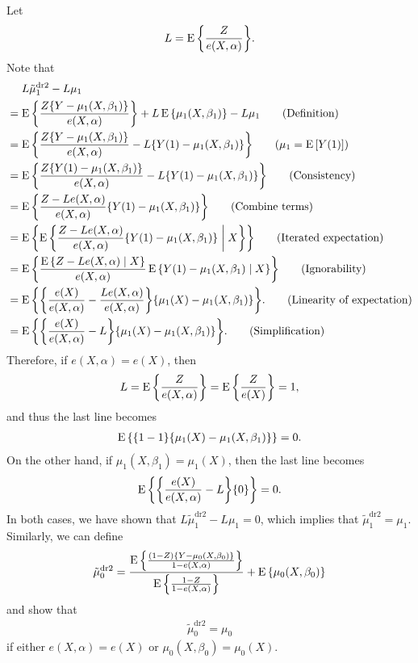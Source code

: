 \documentclass[10pt]{article}
\begin{document}
Let 
\begin{align*}
  L = \operatorname{E}{\left\lbrace \frac{Z}{e(X, \alpha)} \right\rbrace}.
\end{align*}
Note that
\begin{align*}
  &\mathrel{\phantom{=}} L\tilde{\mu}_1^{\text{dr2}} - L\mu_1 \\
  &= \E\bc{\frac{Z\bc{Y - \mu_1(X, \beta_1)}}{e(X, \alpha)}} + L\E\bc{\mu_1(X, \beta_1)} - L\mu_1 \tag{Definition} \\
  &= \E\bc{\frac{Z\bc{Y - \mu_1(X, \beta_1)}}{e(X, \alpha)} - L\bc{Y(1) - \mu_1(X, \beta_1)}} \tag{$\mu_1 = \E\bs{Y(1)}$} \\
  &= \E\bc{\frac{Z\bc{Y(1) - \mu_1(X, \beta_1)}}{e(X, \alpha)} - L\bc{Y(1) - \mu_1(X, \beta_1)}} \tag{Consistency} \\
  &= \E\bc{\frac{Z - Le(X, \alpha)}{e(X, \alpha)}\bc{Y(1) - \mu_1(X, \beta_1)}} \tag{Combine terms} \\
  &= \E\bc{\E\bc{\frac{Z - Le(X, \alpha)}{e(X, \alpha)}\bc{Y(1) - \mu_1(X, \beta_1)} \;\middle|\; X}} \tag{Iterated expectation} \\
  &= \E\bc{\frac{\E\bc{Z - Le(X, \alpha) \mid X}}{e(X, \alpha)}\E\bc{Y(1) - \mu_1(X, \beta_1) \mid X}} \tag{Ignorability} \\
  &= \E\bc{\bc{\frac{e(X)}{e(X, \alpha)} - \frac{L e(X, \alpha)}{e(X, \alpha)}} \bc{\mu_1(X) - \mu_1(X, \beta_1)}}. \tag{Linearity of expectation} \\
  &= \E\bc{\bc{\frac{e(X)}{e(X, \alpha)} - L} \bc{\mu_1(X) - \mu_1(X, \beta_1)}}. \tag{Simplification}
\end{align*}
Therefore,
if $e(X, \alpha) = e(X)$,
then
\begin{align*}
  L = \operatorname{E}{\left\lbrace \frac{Z}{e(X, \alpha)} \right\rbrace} 
  = \operatorname{E}{\left\lbrace \frac{Z}{e(X)} \right\rbrace}
  = 1,
\end{align*}
and thus the last line becomes
\begin{align*}
  \operatorname{E}{\left\lbrace {\left\lbrace 1 - 1 \right\rbrace} {\left\lbrace \mu_1(X) - \mu_1(X, \beta_1) \right\rbrace} \right\rbrace} = 0.
\end{align*}
On the other hand,
if $\mu_1(X, \beta_1) = \mu_1(X)$,
then the last line becomes
\begin{align*}
  \operatorname{E}{\left\lbrace {\left\lbrace \frac{e(X)}{e(X, \alpha)} - L \right\rbrace} {\left\lbrace 0 \right\rbrace} \right\rbrace} = 0.
\end{align*}
In both cases,
we have shown that
$L\tilde{\mu}_1^{\text{dr2}} - L\mu_1 = 0$,
which implies that
$\tilde{\mu}_1^{\text{dr2}} = \mu_1$.
Similarly,
we can define
\begin{align*}
  \tilde{\mu}_0^{\text{dr2}}
  = \frac{\operatorname{E}{\left\lbrace \frac{(1 - Z){\left\lbrace Y - \mu_0(X, \beta_0) \right\rbrace}}{1 - e(X, \alpha)} \right\rbrace}}{\operatorname{E}{\left\lbrace \frac{1 - Z}{1 - e(X, \alpha)} \right\rbrace}} + \operatorname{E}{\left\lbrace \mu_0(X, \beta_0) \right\rbrace}
\end{align*}
and show that
\begin{align*}
  \tilde{\mu}_0^{\text{dr2}} = \mu_0
\end{align*}
if either $e(X, \alpha) = e(X)$ or $\mu_0(X, \beta_0) = \mu_0(X)$.
\end{document}
